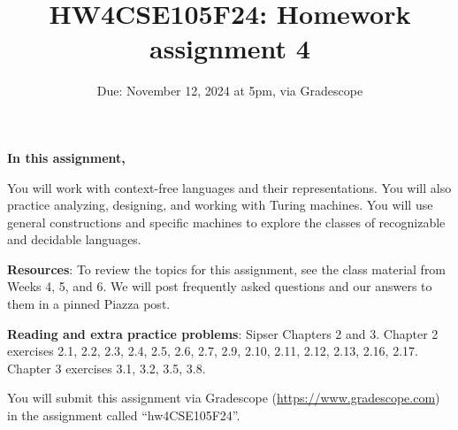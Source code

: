 \title{HW4CSE105F24: Homework assignment 4}
\date{Due: November 12, 2024 at 5pm, via Gradescope}



\maketitle
\thispagestyle{fancy}

{\bf In this assignment,}

You will work with context-free languages and their representations.
You will  also practice analyzing, designing, and working with Turing machines.
You will use general constructions and specific machines to explore the classes 
of recognizable and decidable languages.


{\bf Resources}: To review the topics 
for this assignment, see the class material from Weeks 4, 5, and 6.
We will post frequently asked questions and our answers to them in a 
pinned Piazza post. 

{\bf Reading and extra practice problems}:  
Sipser Chapters 2 and 3.
Chapter 2 exercises 2.1, 2.2, 2.3, 2.4, 2.5, 2.6, 2.7, 2.9, 2.10, 2.11, 2.12, 2.13, 2.16, 2.17.
Chapter 3 exercises 3.1, 3.2, 3.5, 3.8.

\instructions

You will submit this assignment via Gradescope
(\href{https://www.gradescope.com}{https://www.gradescope.com}) 
in the assignment called ``hw4CSE105F24''.

